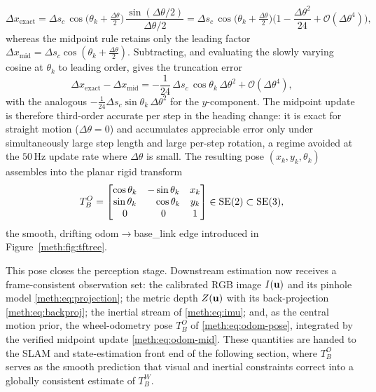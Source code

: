 \begin{equation}
\Delta x_{\mathrm{exact}}
= \Delta s_c\,\cos\!\Big(\theta_k+\tfrac{\Delta\theta}{2}\Big)\,
\frac{\sin(\Delta\theta/2)}{\Delta\theta/2}
= \Delta s_c\,\cos\!\Big(\theta_k+\tfrac{\Delta\theta}{2}\Big)\Big(1 - \frac{\Delta\theta^{2}}{24} + \mathcal{O}(\Delta\theta^{4})\Big),
\label{meth:eq:odom-expand}
\end{equation}
whereas the midpoint rule retains only the leading factor $\Delta x_{\mathrm{mid}} = \Delta s_c\cos(\theta_k+\tfrac{\Delta\theta}{2})$. Subtracting, and evaluating the slowly varying cosine at $\theta_k$ to leading order, gives the truncation error
\begin{equation}
\Delta x_{\mathrm{exact}} - \Delta x_{\mathrm{mid}}
= -\frac{1}{24}\,\Delta s_c\,\cos\theta_k\,\Delta\theta^{2} + \mathcal{O}(\Delta\theta^{4}),
\label{meth:eq:odom-err}
\end{equation}
with the analogous $-\tfrac{1}{24}\Delta s_c\sin\theta_k\,\Delta\theta^{2}$ for the $y$-component. The midpoint update is therefore third-order accurate per step in the heading change: it is exact for straight motion ($\Delta\theta=0$) and accumulates appreciable error only under simultaneously large step length and large per-step rotation, a regime avoided at the \ensuremath{50\,\mathrm{Hz}} update rate where $\Delta\theta$ is small. The resulting pose $(x_k,y_k,\theta_k)$ assembles into the planar rigid transform
\begin{equation}
T^{O}_{B} =
\begin{bmatrix}
\cos\theta_k & -\sin\theta_k & x_k \\
\sin\theta_k & \phantom{-}\cos\theta_k & y_k \\
0 & 0 & 1
\end{bmatrix}\in\mathrm{SE}(2)\subset\mathrm{SE}(3),
\label{meth:eq:odom-pose}
\end{equation}
the smooth, drifting odom$\rightarrow$base\_link edge introduced in Figure~\ref{meth:fig:tftree}.

This pose closes the perception stage. Downstream estimation now receives a frame-consistent observation set: the calibrated RGB image $I(\mathbf{u})$ and its pinhole model \eqref{meth:eq:projection}; the metric depth $Z(\mathbf{u})$ with its back-projection \eqref{meth:eq:backproj}; the inertial stream of \eqref{meth:eq:imu}; and, as the central motion prior, the wheel-odometry pose $T^{O}_{B}$ of \eqref{meth:eq:odom-pose}, integrated by the verified midpoint update \eqref{meth:eq:odom-mid}. These quantities are handed to the SLAM and state-estimation front end of the following section, where $T^{O}_{B}$ serves as the smooth prediction that visual and inertial constraints correct into a globally consistent estimate of $T^{W}_{B}$.


